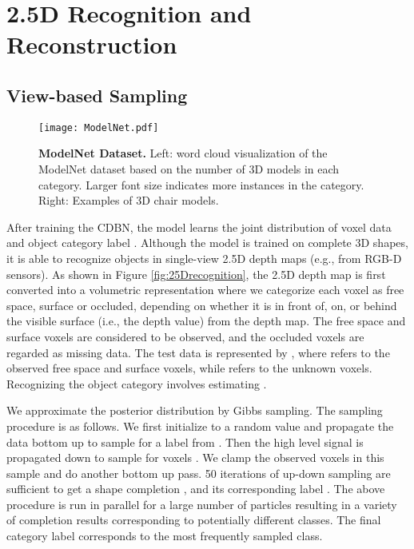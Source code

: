 \documentclass[10pt,twocolumn,letterpaper]{article}
\begin{document}
\section{2.5D Recognition and Reconstruction}



\subsection{View-based Sampling}


\begin{figure*}[t]
\vspace{-2mm}

\texttt{[image: ModelNet.pdf]}

\vspace{-2mm}
\caption{{\bf ModelNet Dataset.} Left: word cloud visualization of the ModelNet dataset based on the number of
3D models in each category. Larger font size indicates more instances in the category. Right: Examples of 3D chair models.}
\label{fig:modelnet}
\vspace{-3mm}
\end{figure*}




After training the CDBN, the model learns the joint distribution  of voxel data  and object category label . 
Although the model is trained on complete 3D shapes,
it is able to recognize objects in single-view 2.5D depth maps (e.g., from RGB-D sensors).
As shown in Figure \ref{fig:25Drecognition},
the 2.5D depth map is first converted into a volumetric representation where we categorize each voxel as free space, surface or occluded,
depending on whether it is in front of, on, or behind the visible surface (i.e., the depth value) from the depth map.
The free space and surface voxels are considered to be observed, and the occluded voxels are regarded as missing data.
The test data is represented by , where  refers to the observed free space and surface voxels,
while  refers to the unknown voxels.
Recognizing the object category involves estimating . 







We approximate the posterior distribution  by Gibbs sampling. The sampling procedure is as follows. We first initialize  to a random value and propagate the data  bottom up to sample for a label  from . Then the high level signal is propagated down to sample for voxels . We clamp the observed voxels  in this sample  and do another bottom up pass. 50 iterations of up-down sampling are sufficient to get a shape completion , and its corresponding label . 
The above procedure is run in parallel for a large number of particles resulting in a variety of completion results corresponding to potentially different classes. The final category label corresponds to the most frequently sampled class.
\end{document}
